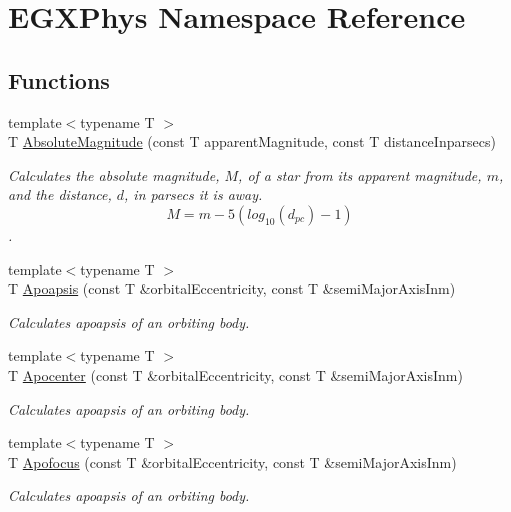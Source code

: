 \hypertarget{namespace_e_g_x_phys}{}\section{E\+G\+X\+Phys Namespace Reference}
\label{namespace_e_g_x_phys}
\subsection*{Functions}
\begin{DoxyCompactItemize}
\item 
{\footnotesize template$<$typename T $>$ }\\T \mbox{\hyperlink{group___e_g_x_phys-_astrophysics-_absolute_magnitude_ga2ddb255fa28972334d82f377ce182048}{Absolute\+Magnitude}} (const T apparent\+Magnitude, const T distance\+Inparsecs)
\begin{DoxyCompactList}\small\item\em Calculates the absolute magnitude, $M$, of a star from its apparent magnitude, $m$, and the distance, $d$, in parsecs it is away. \[M= m - 5 \left ( log_{10}(d_{pc}) - 1 \right )\]. \end{DoxyCompactList}\item 
{\footnotesize template$<$typename T $>$ }\\T \mbox{\hyperlink{group___e_g_x_phys-_apoapsis_gafd08a2d1d64886e7bb9bcb7ff65bc3ea}{Apoapsis}} (const T \&orbital\+Eccentricity, const T \&semi\+Major\+Axis\+Inm)
\begin{DoxyCompactList}\small\item\em Calculates apoapsis of an orbiting body. \end{DoxyCompactList}\item 
{\footnotesize template$<$typename T $>$ }\\T \mbox{\hyperlink{group___e_g_x_phys-_apoapsis_gaacffba78614c5b4d5488d8e9b8c661ee}{Apocenter}} (const T \&orbital\+Eccentricity, const T \&semi\+Major\+Axis\+Inm)
\begin{DoxyCompactList}\small\item\em Calculates apoapsis of an orbiting body. \end{DoxyCompactList}\item 
{\footnotesize template$<$typename T $>$ }\\T \mbox{\hyperlink{group___e_g_x_phys-_apoapsis_gada28ef9258703e9e32ac9e564544ae87}{Apofocus}} (const T \&orbital\+Eccentricity, const T \&semi\+Major\+Axis\+Inm)
\begin{DoxyCompactList}\small\item\em Calculates apoapsis of an orbiting body. \end{DoxyCompactList}\item 

\end{DoxyCompactItemize}
